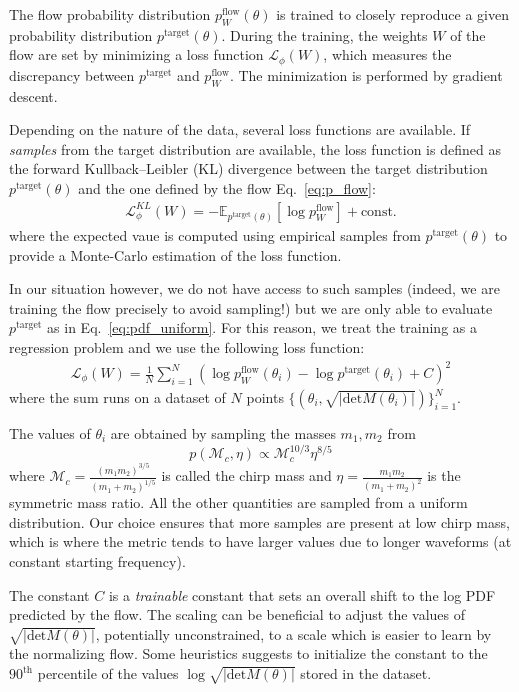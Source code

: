 \documentclass[twocolumn,showpacs,preprintnumbers,nofootinbib,prd,
superscriptaddress,10pt]{revtex4-2}
\begin{document}
The flow probability distribution $p^\text{flow}_W(\theta)$ is trained to closely reproduce a given probability distribution $p^\text{target}(\theta)$.
During the training, the weights $W$ of the flow are set by minimizing a loss function $\mathcal{L}_\phi(W)$, which measures the discrepancy between $p^\text{target}$ and $p^\text{flow}_W$. The minimization is performed by gradient descent.


Depending on the nature of the data, several loss functions are available.
If {\it samples} from the target distribution are available, the loss function is defined as the forward Kullback–Leibler (KL) divergence between the target distribution $p^\text{target}(\theta)$ and the one defined by the flow Eq.~\eqref{eq:p_flow}:
\begin{align}
	\mathcal{L}^{KL}_\phi(W) = - \mathbb{E}_{p^\text{target}(\theta)} [\log p^\text{flow}_W] + \text{const.}
\end{align}
where the expected vaue is computed using empirical samples from $p^\text{target}(\theta)$ to provide a Monte-Carlo estimation of the loss function.

In our situation however, we do not have access to such samples (indeed, we are training the flow precisely to avoid sampling!) but we are only able to evaluate $p^\text{target}$ as in Eq.~\eqref{eq:pdf_uniform}.
For this reason, we treat the training as a regression problem and we use the following loss function:
%
\begin{align}
	\mathcal{L}_\phi(W) = \frac{1}{N} \sum_{i=1}^N \left(\log p^\text{flow}_W(\theta_i) - \log p^\text{target}(\theta_i) + C \right)^2
\end{align}
%
where the sum runs on a dataset of $N$ points $\{(\theta_i, \sqrt{|\text{det}M(\theta_i)|})\}_{i=1}^N$.

The values of $\theta_i$ are obtained by sampling the masses $m_1, m_2$ from
\begin{equation}
	p(\mathcal{M}_c, \eta) \propto \mathcal{M}_c^{10/3} \eta^{8/5}
\end{equation}
where $\mathcal{M}_c = \frac{(m_1m_2)^{3/5}}{(m_1+m_2)^{1/5}}$ is called the chirp mass and $\eta = \frac{m_1m_2}{(m_1+m_2)^2}$ is the symmetric mass ratio.
All the other quantities are sampled from a uniform distribution.
Our choice ensures that more samples are present at low chirp mass, which is where the metric tends to have larger values due to longer waveforms (at constant starting frequency).

The constant $C$ is a {\it trainable} constant that sets an overall shift to the log PDF predicted by the flow. The scaling can be beneficial to adjust the values of $\sqrt{|\text{det}M(\theta)|}$, potentially unconstrained, to a scale which is easier to learn by the normalizing flow.
Some heuristics suggests to initialize the constant to the $90^\text{th}$ percentile of the values $\log \sqrt{|\text{det}M(\theta)|}$ stored in the dataset.
\end{document}
